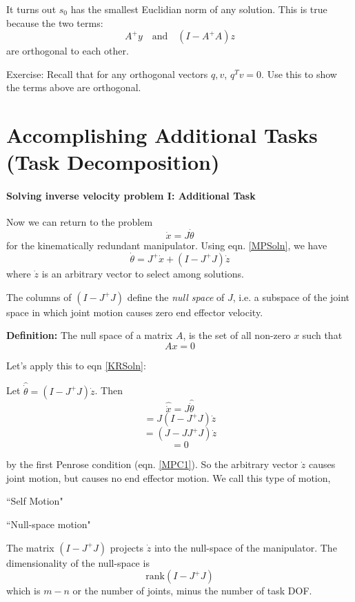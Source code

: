 It turns out $s_0$ has the smallest Euclidian norm of any solution. This
is true because the two terms:
\[
     A^{+}y \quad \mathrm{and} \quad (I-A^{+}A)z
\]
are orthogonal to each other.

Exercise: Recall that for any orthogonal vectors $q, v$, $q^Tv =0$.
Use this to show the terms above are orthogonal.



\section{Accomplishing Additional Tasks (Task Decomposition)}



\paragraph{Solving inverse velocity problem I: Additional Task}

Now we can return to the problem
\[
\dot{x} = J \dot{\theta}
\]
for the kinematically redundant manipulator.  Using eqn. \ref{MPSoln},
we have
\begin{equation}\label{KRSoln}
\dot{\theta} = J^{+}\dot{x} + (I-J^{+}J)\dot{z}
\end{equation}
where $\dot{z} $ is an arbitrary vector to select among solutions.

The columns of $(I-J^{+}J)$ define the {\it null space} of $J$, i.e. a
subspace of the joint space in which joint motion causes zero end
effector velocity.

{\bf Definition: }  The null space of a matrix $A$, is the set of all
non-zero $x$ such that
\[
Ax = 0
\]

Let's apply this to eqn \ref{KRSoln}:

Let $\hat{\dot{\theta}} = (I-J^{+}J)\dot{z}$.   Then
\[
\hat{\dot{x}} = J\hat{\dot{\theta}}
\]
\[
 =  J (I-J^{+}J)\dot{z}
\]
\[
 =  (J - JJ^{+}J) \dot{z}
\]
\[
 = 0
\]

by the first Penrose condition (eqn. \ref{MPC1}).
So the arbitrary vector $\dot{z}$ causes joint motion, but causes
no end effector motion. We call this type of motion,

``Self Motion"

``Null-space motion"

The matrix $  (I-J^{+}J)$ projects $\dot{z}$ into the null-space of the
manipulator.  The dimensionality of the null-space is
\[
\mathrm{rank}(I-J^{+}J)
\]
which is $m - n$ or the number of joints, minus the number of task DOF.

